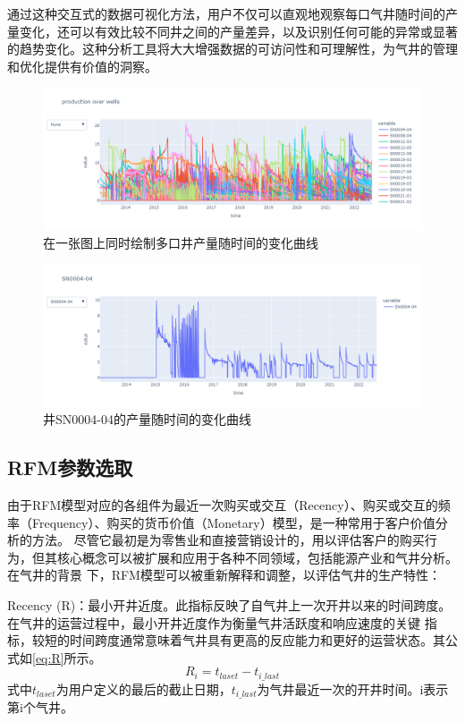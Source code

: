 通过这种交互式的数据可视化方法，用户不仅可以直观地观察每口气井随时间的产量变化，还可以有效比较不同井之间的产量差异，以及识别任何可能的异常或显著的趋势变化。这种分析工具将大大增强数据的可访问性和可理解性，为气井的管理和优化提供有价值的洞察。
\begin{figure}[H]
    \centering
    \includegraphics[scale=0.3,angle=0]{figure/productiongraph.png}
    \caption{在一张图上同时绘制多口井产量随时间的变化曲线}
    \label{fig:productionchange}
\end{figure}
\begin{figure}[H]
    \centering
    \includegraphics[scale=0.3,angle=0]{figure/awellgraph.png}
    \caption{井SN0004-04的产量随时间的变化曲线}
\end{figure}
\subsection{RFM参数选取}
由于RFM模型对应的各组件为最近一次购买或交互（Recency）、购买或交互的频率（Frequency）、购买的货币价值（Monetary）模型，是一种常用于客户价值分析的方法。
尽管它最初是为零售业和直接营销设计的，用以评估客户的购买行为，但其核心概念可以被扩展和应用于各种不同领域，包括能源产业和气井分析。在气井的背景
下，RFM模型可以被重新解释和调整，以评估气井的生产特性：

Recency (R)：最小开井近度。此指标反映了自气井上一次开井以来的时间跨度。在气井的运营过程中，最小开井近度作为衡量气井活跃度和响应速度的关键
指标，较短的时间跨度通常意味着气井具有更高的反应能力和更好的运营状态。其公式如\eqref{eq:R}所示。
\begin{equation}
    R_i = t_{laset} - t_{i\_last}
    \label{eq:R}
\end{equation}
式中$t_{laset}$为用户定义的最后的截止日期，$t_{i\_last}$为气井最近一次的开井时间。i表示第i个气井。

